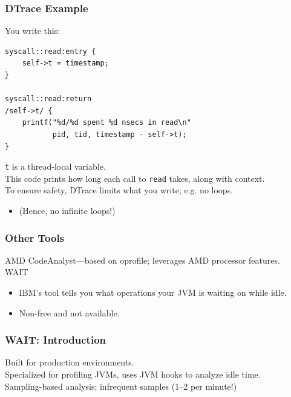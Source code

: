 \begin{frame}[fragile]
  \frametitle{DTrace Example}


  You write this:

  \begin{lstlisting}
syscall::read:entry {
    self->t = timestamp;
}

syscall::read:return
/self->t/ {
    printf("%d/%d spent %d nsecs in read\n"
           pid, tid, timestamp - self->t);
}
  \end{lstlisting}

    {\tt t} is a thread-local variable.\\
    This code prints how long each call to {\tt read} takes, along with
      context.\\[1em]
    To ensure safety, DTrace limits what you write; e.g. no loops.
      \begin{itemize}
        \item (Hence, no infinite loops!)
      \end{itemize}


\end{frame}

\begin{frame}[fragile]
  \frametitle{Other Tools}


    AMD CodeAnalyst---based on oprofile; leverages AMD processor features.\\[1em]

    WAIT
      \begin{itemize}
        \item IBM's tool tells you what operations your JVM is waiting on while
          idle.
        \item Non-free and not available.
      \end{itemize}

\end{frame}

\begin{frame}
  \frametitle{WAIT: Introduction}


Built for production environments.\\[1em]

Specialized for profiling JVMs, uses JVM hooks to analyze idle time.\\[1em]

Sampling-based analysis; infrequent samples (1--2 per minute!)

\end{frame}

